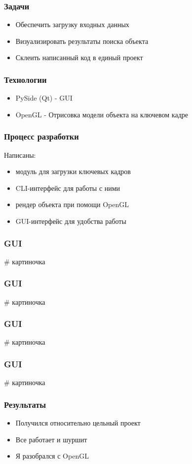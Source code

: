 \begin{frame}\frametitle{Задачи}
    \begin{itemize}
        \item Обеспечить загрузку входных данных
        \item Визуализировать результаты поиска объекта
        \item Склеить написанный код в единый проект
    \end{itemize}
\end{frame}

\begin{frame}\frametitle{Технологии}
    \begin{itemize}
        \item PySide (Qt) - GUI
        \item OpenGL      - Отрисовка модели объекта на ключевом кадре
    \end{itemize}
\end{frame}

\begin{frame}\frametitle{Процесс разработки}
    Написаны:
    \begin{itemize}
        \item модуль для загрузки ключевых кадров
        \item CLI-интерфейс для работы с ними
        \item рендер объекта при помощи OpenGL
        \item GUI-интерфейс для удобства работы
    \end{itemize}
\end{frame}

\begin{frame}\frametitle{GUI}
    # картиночка
\end{frame}

\begin{frame}\frametitle{GUI}
    # картиночка
\end{frame}

\begin{frame}\frametitle{GUI}
    # картиночка
\end{frame}

\begin{frame}\frametitle{GUI}
    # картиночка
\end{frame}

\begin{frame}\frametitle{Результаты}
    \begin{itemize}
        \item Получился относительно цельный проект
        \item Все работает и шуршит
        \item Я разобрался с OpenGL
    \end{itemize}
\end{frame}
